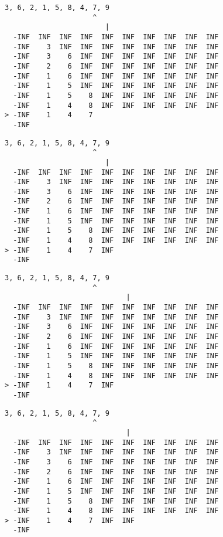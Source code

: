 { \begin{verbatim}
3, 6, 2, 1, 5, 8, 4, 7, 9
                     ^
                        |
  -INF  INF  INF  INF  INF  INF  INF  INF  INF  INF
  -INF    3  INF  INF  INF  INF  INF  INF  INF  INF
  -INF    3    6  INF  INF  INF  INF  INF  INF  INF
  -INF    2    6  INF  INF  INF  INF  INF  INF  INF
  -INF    1    6  INF  INF  INF  INF  INF  INF  INF
  -INF    1    5  INF  INF  INF  INF  INF  INF  INF
  -INF    1    5    8  INF  INF  INF  INF  INF  INF
  -INF    1    4    8  INF  INF  INF  INF  INF  INF
> -INF    1    4    7                              
  -INF                                             
\end{verbatim} }

{ \begin{verbatim}
3, 6, 2, 1, 5, 8, 4, 7, 9
                     ^
                        |
  -INF  INF  INF  INF  INF  INF  INF  INF  INF  INF
  -INF    3  INF  INF  INF  INF  INF  INF  INF  INF
  -INF    3    6  INF  INF  INF  INF  INF  INF  INF
  -INF    2    6  INF  INF  INF  INF  INF  INF  INF
  -INF    1    6  INF  INF  INF  INF  INF  INF  INF
  -INF    1    5  INF  INF  INF  INF  INF  INF  INF
  -INF    1    5    8  INF  INF  INF  INF  INF  INF
  -INF    1    4    8  INF  INF  INF  INF  INF  INF
> -INF    1    4    7  INF                         
  -INF                                             
\end{verbatim} }

{ \begin{verbatim}
3, 6, 2, 1, 5, 8, 4, 7, 9
                     ^
                             |
  -INF  INF  INF  INF  INF  INF  INF  INF  INF  INF
  -INF    3  INF  INF  INF  INF  INF  INF  INF  INF
  -INF    3    6  INF  INF  INF  INF  INF  INF  INF
  -INF    2    6  INF  INF  INF  INF  INF  INF  INF
  -INF    1    6  INF  INF  INF  INF  INF  INF  INF
  -INF    1    5  INF  INF  INF  INF  INF  INF  INF
  -INF    1    5    8  INF  INF  INF  INF  INF  INF
  -INF    1    4    8  INF  INF  INF  INF  INF  INF
> -INF    1    4    7  INF                         
  -INF                                             
\end{verbatim} }

{ \begin{verbatim}
3, 6, 2, 1, 5, 8, 4, 7, 9
                     ^
                             |
  -INF  INF  INF  INF  INF  INF  INF  INF  INF  INF
  -INF    3  INF  INF  INF  INF  INF  INF  INF  INF
  -INF    3    6  INF  INF  INF  INF  INF  INF  INF
  -INF    2    6  INF  INF  INF  INF  INF  INF  INF
  -INF    1    6  INF  INF  INF  INF  INF  INF  INF
  -INF    1    5  INF  INF  INF  INF  INF  INF  INF
  -INF    1    5    8  INF  INF  INF  INF  INF  INF
  -INF    1    4    8  INF  INF  INF  INF  INF  INF
> -INF    1    4    7  INF  INF                    
  -INF                                             
\end{verbatim} }

